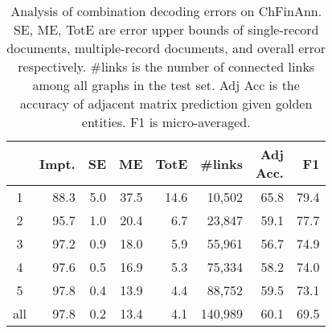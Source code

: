 \begin{table}[bth]
    \centering
    \small
    \begin{tabular}{crrrrrrr}
        \toprule
         & Impt. & SE & ME & TotE & \#links & \makecell{Adj\\Acc.} & F1 \\
        \midrule
        1 & 88.3 & 5.0 & 37.5 & 14.6 & 10,502 & 65.8 & 79.4 \\
        2 & 95.7 & 1.0 & 20.4 & 6.7 & 23,847 & 59.1 & 77.7 \\
        3 & 97.2 & 0.9 & 18.0 & 5.9 & 55,961 & 56.7 & 74.9 \\
        4 & 97.6 & 0.5 & 16.9 & 5.3 & 75,334 & 58.2 & 74.0 \\
        5 & 97.8 & 0.4 & 13.9 & 4.4 & 88,752 & 59.5 & 73.1 \\
        all & 97.8 & 0.2 & 13.4 & 4.1 & 140,989 & 60.1 & 69.5 \\
        \bottomrule
    \end{tabular}
    \caption{
        Analysis of combination decoding errors on ChFinAnn.
        SE, ME, TotE are error upper bounds of single-record documents, multiple-record documents, and overall error respectively.
        \#links is the number of connected links among all graphs in the test set.
        Adj Acc is the accuracy of adjacent matrix prediction given golden entities.
        F1 is micro-averaged.
    }
    \label{tab:upper_bound}
\end{table}
